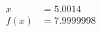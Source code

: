 \documentclass[preview]{standalone}
\begin{document}
\begin{align*}
x &= 5.0014\\f(x) &= 7.9999998
\end{align*}
\end{document}
